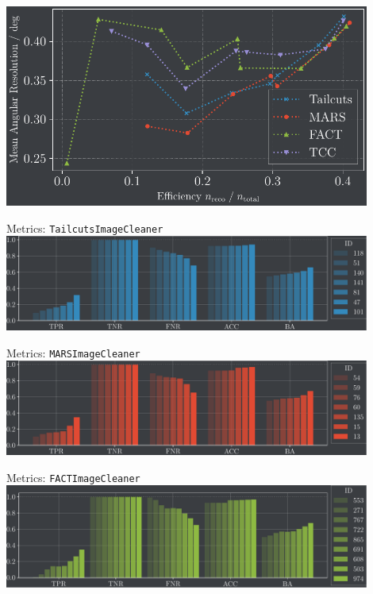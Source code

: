 \begin{frame}
    \centering
    \includegraphics[width=0.9\textwidth]{build/ar_vs_eff.pdf}
\end{frame}

\begin{frame}{Metrics: \texttt{TailcutsImageCleaner}}
    \centering
    \includegraphics[width=0.9\textwidth]{build/metrics_tailcuts.pdf}
\end{frame}

\begin{frame}{Metrics: \texttt{MARSImageCleaner}}
    \centering
    \includegraphics[width=0.9\textwidth]{build/metrics_mars.pdf}
\end{frame}

\begin{frame}{Metrics: \texttt{FACTImageCleaner}}
    \vspace{-0.28cm}
    \centering
    \includegraphics[width=0.9\textwidth]{build/metrics_fact.pdf}
\end{frame}

